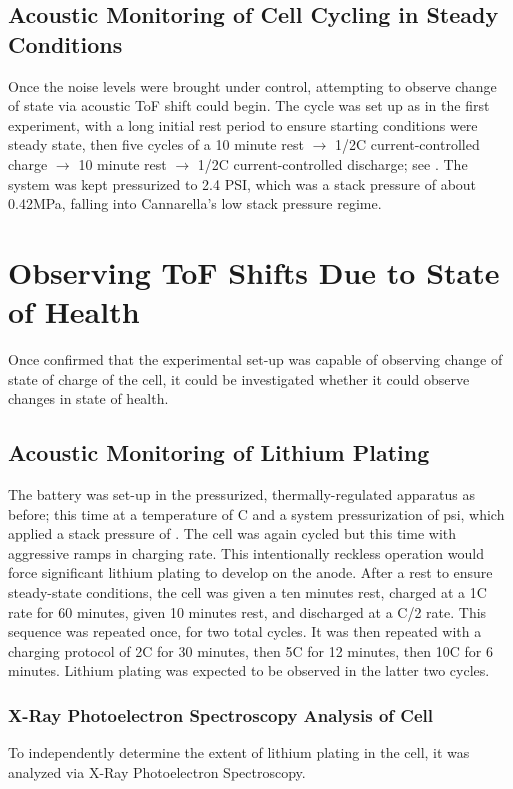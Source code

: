 \subsection{Acoustic Monitoring of Cell Cycling in Steady Conditions}
Once the noise levels were brought under control, attempting to observe change of state via acoustic ToF shift could begin. The cycle was set up as in the first experiment, with a long initial rest period to ensure starting conditions were steady state, then five cycles of a 10 minute rest $\rightarrow$ 1/2C current-controlled charge $\rightarrow$ 10 minute rest $\rightarrow$ 1/2C current-controlled discharge; see . 
The system was kept pressurized to 2.4 PSI, which was a stack pressure of about 0.42MPa, falling into Cannarella's low stack pressure regime.

\section{Observing ToF Shifts Due to State of Health} 
Once confirmed that the experimental set-up was capable of observing change of state of charge of the cell, it could be investigated whether it could observe changes in state of health.

\subsection{Acoustic Monitoring of Lithium Plating}
The battery was set-up in the pressurized, thermally-regulated apparatus as before; this time at a temperature of  C and a system pressurization of  psi, which applied a stack pressure of . 
The cell was again cycled but this time with aggressive ramps in charging rate. 
This intentionally reckless operation would force significant lithium plating to develop on the anode. 
After a rest to ensure steady-state conditions, the cell was given a ten minutes rest, charged at a 1C rate for 60 minutes, given 10 minutes rest, and discharged at a C/2 rate. 
This sequence was repeated once, for two total cycles. 
It was then repeated with a charging protocol of 2C for 30 minutes, then 5C for 12 minutes, then 10C for 6 minutes. 
Lithium plating was expected to be observed in the latter two cycles.
    
\subsubsection{X-Ray Photoelectron Spectroscopy Analysis of Cell}
    To independently determine the extent of lithium plating in the cell, it was analyzed via X-Ray Photoelectron Spectroscopy.

